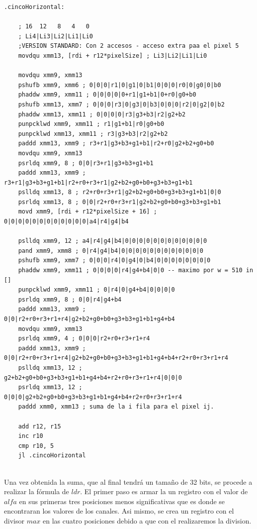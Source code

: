 \begin{codesnippet}
\begin{verbatim}
.cincoHorizontal:

    ; 16  12   8   4   0
    ; Li4|Li3|Li2|Li1|Li0
    ;VERSION STANDARD: Con 2 accesos - acceso extra paa el pixel 5
    movdqu xmm13, [rdi + r12*pixelSize] ; Li3|Li2|Li1|Li0

    movdqu xmm9, xmm13
    pshufb xmm9, xmm6 ; 0|0|0|r1|0|g1|0|b1|0|0|0|r0|0|g0|0|b0
    phaddw xmm9, xmm11 ; 0|0|0|0|0+r1|g1+b1|0+r0|g0+b0 
    pshufb xmm13, xmm7 ; 0|0|0|r3|0|g3|0|b3|0|0|0|r2|0|g2|0|b2
    phaddw xmm13, xmm11 ; 0|0|0|0|r3|g3+b3|r2|g2+b2 
    punpcklwd xmm9, xmm11 ; r1|g1+b1|r0|g0+b0
    punpcklwd xmm13, xmm11 ; r3|g3+b3|r2|g2+b2
    paddd xmm13, xmm9 ; r3+r1|g3+b3+g1+b1|r2+r0|g2+b2+g0+b0 
    movdqu xmm9, xmm13
    psrldq xmm9, 8 ; 0|0|r3+r1|g3+b3+g1+b1
    paddd xmm13, xmm9 ; r3+r1|g3+b3+g1+b1|r2+r0+r3+r1|g2+b2+g0+b0+g3+b3+g1+b1 
    pslldq xmm13, 8 ; r2+r0+r3+r1|g2+b2+g0+b0+g3+b3+g1+b1|0|0
    psrldq xmm13, 8 ; 0|0|r2+r0+r3+r1|g2+b2+g0+b0+g3+b3+g1+b1
    movd xmm9, [rdi + r12*pixelSize + 16] ; 0|0|0|0|0|0|0|0|0|0|0|0|a4|r4|g4|b4

    pslldq xmm9, 12 ; a4|r4|g4|b4|0|0|0|0|0|0|0|0|0|0|0|0
    pand xmm9, xmm8 ; 0|r4|g4|b4|0|0|0|0|0|0|0|0|0|0|0|0
    pshufb xmm9, xmm7 ; 0|0|0|r4|0|g4|0|b4|0|0|0|0|0|0|0|0
    phaddw xmm9, xmm11 ; 0|0|0|0|r4|g4+b4|0|0 -- maximo por w = 510 in []
    punpcklwd xmm9, xmm11 ; 0|r4|0|g4+b4|0|0|0|0
    psrldq xmm9, 8 ; 0|0|r4|g4+b4
    paddd xmm13, xmm9 ; 0|0|r2+r0+r3+r1+r4|g2+b2+g0+b0+g3+b3+g1+b1+g4+b4 
    movdqu xmm9, xmm13
    psrldq xmm9, 4 ; 0|0|0|r2+r0+r3+r1+r4
    paddd xmm13, xmm9 ; 0|0|r2+r0+r3+r1+r4|g2+b2+g0+b0+g3+b3+g1+b1+g4+b4+r2+r0+r3+r1+r4 
    pslldq xmm13, 12 ; g2+b2+g0+b0+g3+b3+g1+b1+g4+b4+r2+r0+r3+r1+r4|0|0|0
    psrldq xmm13, 12 ; 0|0|0|g2+b2+g0+b0+g3+b3+g1+b1+g4+b4+r2+r0+r3+r1+r4
    paddd xmm0, xmm13 ; suma de la i fila para el pixel ij.

    add r12, r15
    inc r10
    cmp r10, 5
    jl .cincoHorizontal
    
\end{verbatim}
\end{codesnippet}

Una vez obtenida la suma, que al final tendrá un tamaño de 32 bits, se procede a realizar la fórmula de $ldr$. 
El primer paso es armar la un registro con el valor de $alfa$ en sus primeras tres posiciones menos significativas que es donde se encontraran los valores de los canales. Asi mismo, se crea un registro con el divisor $max$ en las cuatro posiciones debido a que con el realizaremos la division.\\

